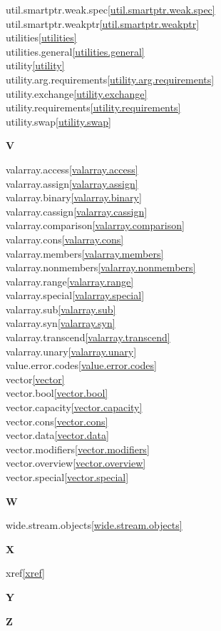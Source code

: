 \begin{multicols}{2}
util.smartptr.weak.spec\quad\ref{util.smartptr.weak.spec}\\
util.smartptr.weakptr\quad\ref{util.smartptr.weakptr}\\
utilities\quad\ref{utilities}\\
utilities.general\quad\ref{utilities.general}\\
utility\quad\ref{utility}\\
utility.arg.requirements\quad\ref{utility.arg.requirements}\\
utility.exchange\quad\ref{utility.exchange}\\
utility.requirements\quad\ref{utility.requirements}\\
utility.swap\quad\ref{utility.swap}\\
\par \textbf{V}\par
valarray.access\quad\ref{valarray.access}\\
valarray.assign\quad\ref{valarray.assign}\\
valarray.binary\quad\ref{valarray.binary}\\
valarray.cassign\quad\ref{valarray.cassign}\\
valarray.comparison\quad\ref{valarray.comparison}\\
valarray.cons\quad\ref{valarray.cons}\\
valarray.members\quad\ref{valarray.members}\\
valarray.nonmembers\quad\ref{valarray.nonmembers}\\
valarray.range\quad\ref{valarray.range}\\
valarray.special\quad\ref{valarray.special}\\
valarray.sub\quad\ref{valarray.sub}\\
valarray.syn\quad\ref{valarray.syn}\\
valarray.transcend\quad\ref{valarray.transcend}\\
valarray.unary\quad\ref{valarray.unary}\\
value.error.codes\quad\ref{value.error.codes}\\
vector\quad\ref{vector}\\
vector.bool\quad\ref{vector.bool}\\
vector.capacity\quad\ref{vector.capacity}\\
vector.cons\quad\ref{vector.cons}\\
vector.data\quad\ref{vector.data}\\
vector.modifiers\quad\ref{vector.modifiers}\\
vector.overview\quad\ref{vector.overview}\\
vector.special\quad\ref{vector.special}\\
\par \textbf{W}\par
wide.stream.objects\quad\ref{wide.stream.objects}\\
\par \textbf{X}\par
xref\quad\ref{xref}\\
\par \textbf{Y}\par
\par \textbf{Z}\par
\end{multicols}

